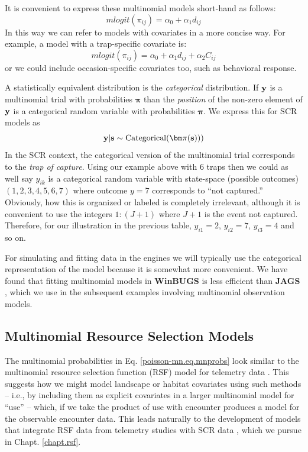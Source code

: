 It is convenient to express these multinomial models short-hand as follows:
\[
mlogit( \pi_{ij} ) = \alpha_{0} + \alpha_{1} d_{ij}
\]
In this way we can refer to models with covariates in a more concise
way. For example, a model with a trap-specific covariate is:
\[
mlogit( \pi_{ij} ) = \alpha_{0} + \alpha_{1} d_{ij} + \alpha_{2} C_{ij}
\]
or we could include occasion-specific covariates too, such as
behavioral response. 

A statistically equivalent distribution is the {\it categorical}
distribution.  If ${\bf y}$ is a multinomial trial with probabilities
${\bm \pi}$ than the {\it position} of the non-zero element of ${\bf
  y}$ is a categorical random variable with probabilities ${\bm \pi}$.
We express this for SCR models as
\[
{\bf y}|{\bf s} \sim \mbox{Categorical}( {\bm \pi}({\bf s})) )
\]
In the SCR context, the categorical version of the
multinomial trial corresponds to the {\it trap of capture}.  Using our
example above with 6 traps then we
could as well say $y_{ik}$ is a categorical random variable with
state-space (possible outcomes) $(1,2,3,4,5,6,7)$ where outcome $y=7$
corresponds to ``not captured.'' Obviously, how this is organized or
labeled is completely irrelevant, although it is convenient to use the
integers $1:(J+1)$ where $J+1$ is the event not captured.  Therefore,
for our illustration in the previous table, $y_{i1} = 2$, $y_{i2} =
7$, $y_{i3} = 4$ and so on.

For simulating and fitting data in the \bugs engines we will typically use
the categorical representation of the model because it is somewhat
more convenient.  We have found that fitting multinomial models in
{\bf WinBUGS} is less efficient than {\bf JAGS}
\citep{converse_royle:2013}, which we use in the subsequent examples
involving multinomial 
observation models.


\subsection{Multinomial  Resource Selection Models}

The multinomial probabilities in Eq. \ref{poisson-mn.eq.mnprobs}
look similar to the 
multinomial resource selection function (RSF) model for telemetry data
\citep{manly_etal:2002, lele_keim:2006}.  This suggests how we might
model landscape or habitat covariates using such methods -- i.e., by
including them as explicit covariates in a larger multinomial model
for ``use'' -- which, if we take the product of use with encounter
produces a model for the observable encounter data. This 
leads naturally to the development of models that integrate RSF data
from telemetry studies with SCR data \citep{royle_chandler:2012},
which we pursue in Chapt. \ref{chapt.rsf}.





